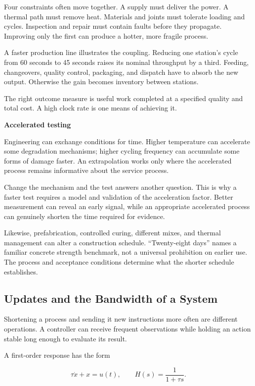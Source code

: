 \documentclass[11pt,openany]{book}
\newcommand{\subhead}[1]{\par\medskip\noindent\textbf{#1}\par\nobreak\smallskip}
\begin{document}
Four constraints often move together. A supply must deliver the power. A thermal path must remove heat. Materials and joints must tolerate loading and cycles. Inspection and repair must contain faults before they propagate. Improving only the first can produce a hotter, more fragile process.

A faster production line illustrates the coupling. Reducing one station's cycle from 60 seconds to 45 seconds raises its nominal throughput by a third. Feeding, changeovers, quality control, packaging, and dispatch have to absorb the new output. Otherwise the gain becomes inventory between stations.

The right outcome measure is useful work completed at a specified quality and total cost. A high clock rate is one means of achieving it.

\subhead{Accelerated testing}

Engineering can exchange conditions for time. Higher temperature can accelerate some degradation mechanisms; higher cycling frequency can accumulate some forms of damage faster. An extrapolation works only where the accelerated process remains informative about the service process.

Change the mechanism and the test answers another question. This is why a faster test requires a model and validation of the acceleration factor. Better measurement can reveal an early signal, while an appropriate accelerated process can genuinely shorten the time required for evidence.

Likewise, prefabrication, controlled curing, different mixes, and thermal management can alter a construction schedule. “Twenty-eight days” names a familiar concrete strength benchmark, not a universal prohibition on earlier use. The process and acceptance conditions determine what the shorter schedule establishes.

\subsection{Updates and the Bandwidth of a System}

Shortening a process and sending it new instructions more often are different operations. A controller can receive frequent observations while holding an action stable long enough to evaluate its result.

A first-order response has the form

\begin{equation}
\tau\dot x+x=u(t),
\qquad
H(s)=\frac{1}{1+\tau s}.
\end{equation}
\end{document}
